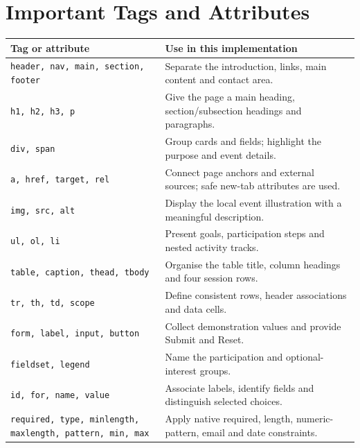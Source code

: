 \documentclass[11pt,a4paper]{article}
\begin{document}
\section{Important Tags and Attributes}
{\small
\begin{tabularx}{\linewidth}{@{}L{48mm}Y@{}}
\toprule
\textbf{Tag or attribute} & \textbf{Use in this implementation} \\
\midrule
\texttt{header, nav, main, section, footer} & Separate the introduction, links, main content and contact area. \\
\texttt{h1, h2, h3, p} & Give the page a main heading, section/subsection headings and paragraphs. \\
\texttt{div, span} & Group cards and fields; highlight the purpose and event details. \\
\texttt{a, href, target, rel} & Connect page anchors and external sources; safe new-tab attributes are used. \\
\texttt{img, src, alt} & Display the local event illustration with a meaningful description. \\
\texttt{ul, ol, li} & Present goals, participation steps and nested activity tracks. \\
\texttt{table, caption, thead, tbody} & Organise the table title, column headings and four session rows. \\
\texttt{tr, th, td, scope} & Define consistent rows, header associations and data cells. \\
\texttt{form, label, input, button} & Collect demonstration values and provide Submit and Reset. \\
\texttt{fieldset, legend} & Name the participation and optional-interest groups. \\
\texttt{id, for, name, value} & Associate labels, identify fields and distinguish selected choices. \\
\texttt{required, type, minlength, maxlength, pattern, min, max} & Apply native required, length, numeric-pattern, email and date constraints. \\
\bottomrule
\end{tabularx}}
\end{document}
